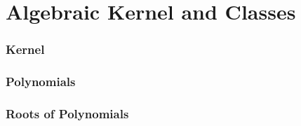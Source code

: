 \section{Algebraic Kernel and Classes}

	\subsubsection*{Kernel}

	\subsubsection*{Polynomials} 

	\subsubsection*{Roots of Polynomials}
